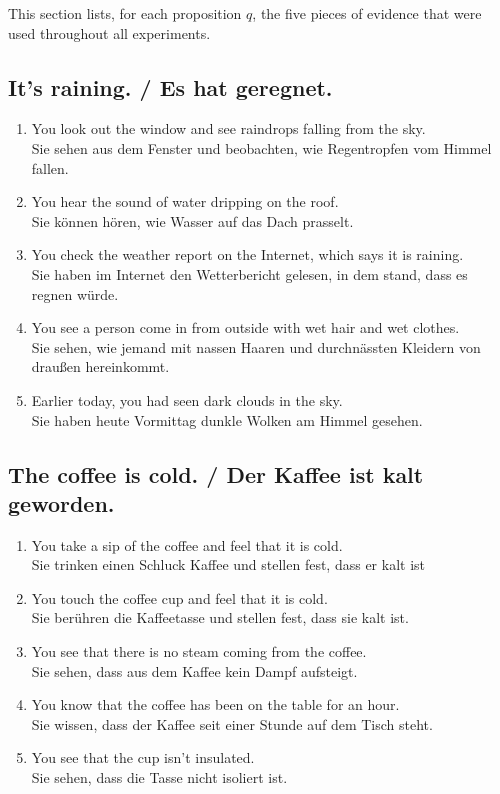 \documentclass[11pt]{article}
\begin{document}
This section lists, for each proposition $q$, the five pieces of evidence that were used throughout all experiments.

\subsection{It's raining. / Es hat geregnet.}

\begin{enumerate}
	\item You look out the window and see raindrops falling from the sky. \\ Sie sehen aus dem Fenster und beobachten, wie Regentropfen vom Himmel fallen. 
	\item You hear the sound of water dripping on the roof. \\ Sie können hören, wie Wasser auf das Dach prasselt.
	\item You check the weather report on the Internet, which says it is raining. \\ Sie haben im Internet den Wetterbericht gelesen, in dem stand, dass es regnen würde. 
	\item You see a person come in from outside with wet hair and wet clothes. \\ Sie sehen, wie jemand mit nassen Haaren und durchnässten Kleidern von draußen hereinkommt.
	\item Earlier today, you had seen dark clouds in the sky. \\ Sie haben heute Vormittag dunkle Wolken am Himmel gesehen.
\end{enumerate}

\subsection{The coffee is cold. / Der Kaffee ist kalt geworden.}

\begin{enumerate} 
	\item You take a sip of the coffee and feel that it is cold. \\
	Sie trinken einen Schluck Kaffee und stellen fest, dass er kalt ist
	\item You touch the coffee cup and feel that it is cold.\\
	Sie berühren die Kaffeetasse und stellen fest, dass sie kalt ist.
	\item You see that there is no steam coming from the coffee.\\
	Sie sehen, dass aus dem Kaffee kein Dampf aufsteigt.
	\item You know that the coffee has been on the table for an hour.\\
	Sie wissen, dass der Kaffee seit einer Stunde auf dem Tisch steht.
	\item You see that the cup isn't insulated.\\
	Sie sehen, dass die Tasse nicht isoliert ist.
\end{enumerate}
\end{document}
